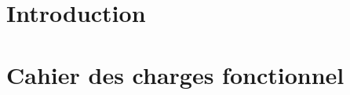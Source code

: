 \documentclass[
    iai, %
    mi, %
]{heig-tb}
\begin{document}
\maketitle
\frontmatter
\clearemptydoublepage

\preamble
\authentification

\begin{abstract}
    
\end{abstract}

\clearemptydoublepage
{
    \tableofcontents
    \let\cleardoublepage\clearpage
    \listoffigures
    \let\cleardoublepage\clearpage
    \listoftables
    \let\cleardoublepage\clearpage
    \listoflistings
}

\printnomenclature
\clearemptydoublepage
{}

\mainmatter
\chapter{Introduction}


\chapter{Cahier des charges fonctionnel}


\clearpage
\printbibliography

\appendix
\appendixpage
\addappheadtotoc



\let\cleardoublepage\clearpage
\backmatter

\label{glossaire}
\printnoidxglossary
\label{index}
\printindex


\end{document}
